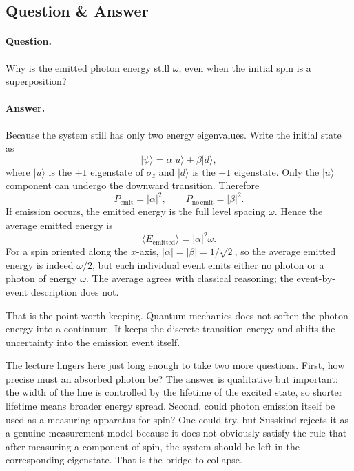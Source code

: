 \subsection{Question \& Answer}

\paragraph{Question.} Why is the emitted photon energy still \(\omega\), even when the initial spin is a superposition?

\paragraph{Answer.} Because the system still has only two energy eigenvalues. Write the initial state as
\begin{equation}
|\psi\rangle=\alpha|u\rangle+\beta|d\rangle,
\end{equation}
where \(|u\rangle\) is the \(+1\) eigenstate of \(\sigma_z\) and \(|d\rangle\) is the \(-1\) eigenstate. Only the \(|u\rangle\) component can undergo the downward transition. Therefore
\begin{equation}
P_{\mathrm{emit}}=|\alpha|^2,
\qquad
P_{\mathrm{no\,emit}}=|\beta|^2.
\end{equation}
If emission occurs, the emitted energy is the full level spacing \(\omega\). Hence the average emitted energy is
\begin{equation}
\langle E_{\mathrm{emitted}}\rangle=|\alpha|^2\omega.
\end{equation}
For a spin oriented along the \(x\)-axis, \(|\alpha|=|\beta|=1/\sqrt2\), so the average emitted energy is indeed \(\omega/2\), but each individual event emits either no photon or a photon of energy \(\omega\). The average agrees with classical reasoning; the event-by-event description does not.

That is the point worth keeping. Quantum mechanics does not soften the photon energy into a continuum. It keeps the discrete transition energy and shifts the uncertainty into the emission event itself.

The lecture lingers here just long enough to take two more questions. First, how precise must an absorbed photon be? The answer is qualitative but important: the width of the line is controlled by the lifetime of the excited state, so shorter lifetime means broader energy spread. Second, could photon emission itself be used as a measuring apparatus for spin? One could try, but Susskind rejects it as a genuine measurement model because it does not obviously satisfy the rule that after measuring a component of spin, the system should be left in the corresponding eigenstate. That is the bridge to collapse.

